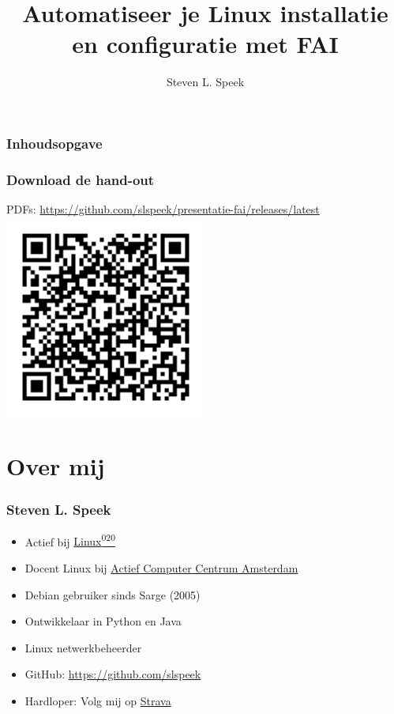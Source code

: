 \documentclass{beamer}
\title[Automatiseer installatie en configuratie] %
{Automatiseer je Linux installatie en configuratie met FAI}
\author[S.L.Speek] %
{Steven L. Speek}
\institute[NLLGG] %
{
  Nederlandse Linux Gebruikers Groep 
}
\date{\displaydate{date}}
\newcommand{\reponame}{presentatie-fai}
\begin{document}
\frame{\titlepage}


\begin{frame}
\frametitle{Inhoudsopgave}
\tableofcontents
\end{frame}
\begin{frame}
\frametitle{Download de hand-out}
PDFs: \url{https://github.com/slspeek/\reponame/releases/latest}
\centering
\includegraphics[width=0.5\textwidth]{img/qr-release.png}
\end{frame}

\section{Over mij}


\begin{frame}
\frametitle{Steven L. Speek}
\begin{itemize}
  \item<2-> Actief bij \href{https://linux020.nl/}{Linux\textsuperscript{020}}
  \item<3-> Docent Linux bij \href{https://accscip.nl/}{Actief Computer Centrum Amsterdam}
  \item<4-> Debian gebruiker sinds Sarge (2005)
  \item<5-> Ontwikkelaar in Python en Java  
  \item<6-> Linux netwerkbeheerder
  \item<7-> GitHub: \url{https://github.com/slspeek}
  \item<8-> Hardloper: Volg mij op \href{https://www.strava.com/athletes/123214921}{Strava}
\end{itemize}
\end{frame}
\end{document}
